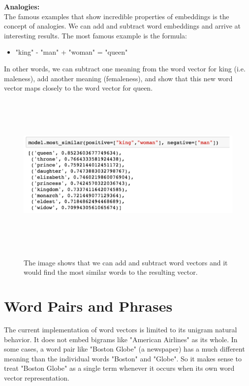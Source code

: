 \noindent \textbf{Analogies:}\\

The famous examples that show incredible properties of embeddings is the concept of analogies. We can add and subtract word embeddings and arrive at interesting results. The most famous example is the formula:
\begin{itemize}
\item{"king" - "man" + "woman" = "queen"}
\end{itemize}
In other words, we can subtract one meaning from the word vector for king (i.e. maleness), add another meaning (femaleness), and show that this new word vector maps closely to the word vector for queen.

\begin{figure}[htbp]
\centering
\includegraphics[width=16cm, height=8cm]{images/king-man+woman-gensim.png}\\
\centering
\caption{The image shows that we can add and subtract word vectors and it would find the most similar words to the resulting vector.}
\label{fig:foo}
\end{figure}

\section{Word Pairs and Phrases}

The current implementation of word vectors is limited to its unigram natural behavior. It does not embed bigrams like "American Airlines" as its whole. In some cases, a word pair like "Boston Globe" (a newspaper) has a much different meaning than the individual words "Boston" and "Globe". So it makes sense to treat "Boston Globe" as a single term whenever it occurs when its own word vector representation.

